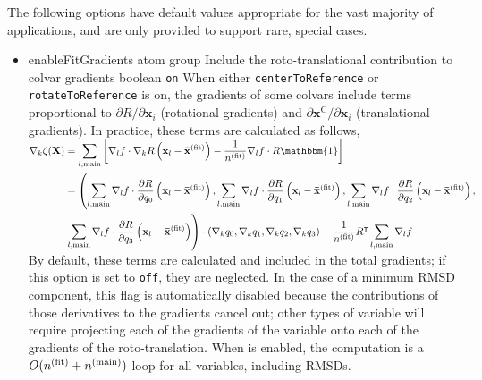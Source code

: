 The following options have default values appropriate for the vast majority of applications, and are only provided to support rare, special cases.
\begin{itemize}

\item %
  \keydef%
    {enableFitGradients}{%
    atom group}{%
    Include the roto-translational contribution to colvar gradients}{%
    boolean}{%
    \texttt{on}}{%
    When either \texttt{centerToReference} or \texttt{rotateToReference} is on,
    the gradients of some colvars include terms proportional to
    $\partial{}R/\partial\mathbf{x}_{i}$ (rotational gradients) and
    $\partial\mathbf{x}^{\mathrm{C}}/\partial\mathbf{x}_{i}$ (translational gradients).
    In practice, these terms are calculated as follows,\newline
    $\begin{aligned}
\nabla_k \zeta(\mathbf{X})&=\sum_{l,\rm main}\left[\nabla_l f \cdot \nabla_k R\left(\mathbf{x}_l-\mathbf{\bar{x}}^{\rm (fit)}\right) - \frac{1}{n^{\rm (fit)}} \nabla_l f \cdot R \mathbbm{1}\right] \\
&=\left(\sum_{l,\rm main}\nabla_l f \cdot\frac{\partial R}{\partial q_0}\left(\mathbf{x}_l-\mathbf{\bar{x}}^{\rm (fit)}\right), \sum_{l,\rm main}\nabla_l f \cdot\frac{\partial R}{\partial q_1}\left(\mathbf{x}_l-\mathbf{\bar{x}}^{\rm (fit)}\right), \sum_{l,\rm main}\nabla_l f \cdot\frac{\partial R}{\partial q_2}\left(\mathbf{x}_l-\mathbf{\bar{x}}^{\rm (fit)}\right), \right.\\
&\left.\sum_{l,\rm main}\nabla_l f \cdot\frac{\partial R}{\partial q_3}\left(\mathbf{x}_l-\mathbf{\bar{x}}^{\rm (fit)}\right)\right) \cdot \left(\nabla_k q_0, \nabla_k q_1, \nabla_k q_2, \nabla_k q_3\right)-\frac{1}{n^{\rm (fit)}} R^{\intercal}\sum_{l,\rm main}{\nabla_l f}
\end{aligned}$\newline
    By default, these terms are calculated and included in the total gradients;
    if this option is set to \texttt{off}, they are neglected.
    In the case of a minimum RMSD component, this flag is automatically disabled because the contributions of those derivatives to the gradients cancel out; other types of variable will require projecting each of the gradients of the variable onto each of the gradients of the roto-translation.
    When  is enabled, the computation is a $O(n^{(\rm fit)}+n^{(\rm main)})$ loop for all variables, including RMSDs.
}

\end{itemize}


